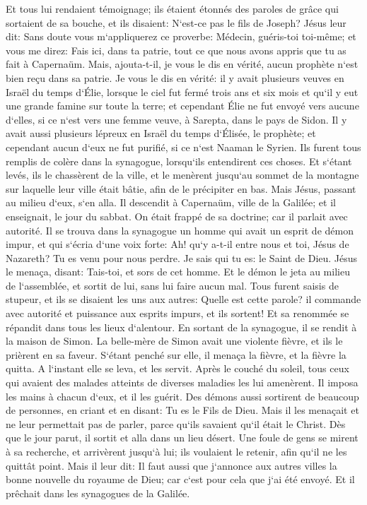 \verse Et tous lui rendaient témoignage; ils étaient étonnés des paroles de grâce qui sortaient de sa bouche, et ils disaient: N`est-ce pas le fils de Joseph? 
\verse Jésus leur dit: Sans doute vous m`appliquerez ce proverbe: Médecin, guéris-toi toi-même; et vous me direz: Fais ici, dans ta patrie, tout ce que nous avons appris que tu as fait à Capernaüm. 
\verse Mais, ajouta-t-il, je vous le dis en vérité, aucun prophète n`est bien reçu dans sa patrie. 
\verse Je vous le dis en vérité: il y avait plusieurs veuves en Israël du temps d`Élie, lorsque le ciel fut fermé trois ans et six mois et qu`il y eut une grande famine sur toute la terre; 
\verse et cependant Élie ne fut envoyé vers aucune d`elles, si ce n`est vers une femme veuve, à Sarepta, dans le pays de Sidon. 
\verse Il y avait aussi plusieurs lépreux en Israël du temps d`Élisée, le prophète; et cependant aucun d`eux ne fut purifié, si ce n`est Naaman le Syrien. 
\verse Ils furent tous remplis de colère dans la synagogue, lorsqu`ils entendirent ces choses. 
\verse Et s`étant levés, ils le chassèrent de la ville, et le menèrent jusqu`au sommet de la montagne sur laquelle leur ville était bâtie, afin de le précipiter en bas. 
\verse Mais Jésus, passant au milieu d`eux, s`en alla. 
\verse Il descendit à Capernaüm, ville de la Galilée; et il enseignait, le jour du sabbat. 
\verse On était frappé de sa doctrine; car il parlait avec autorité. 
\verse Il se trouva dans la synagogue un homme qui avait un esprit de démon impur, et qui s`écria d`une voix forte: 
\verse Ah! qu`y a-t-il entre nous et toi, Jésus de Nazareth? Tu es venu pour nous perdre. Je sais qui tu es: le Saint de Dieu. 
\verse Jésus le menaça, disant: Tais-toi, et sors de cet homme. Et le démon le jeta au milieu de l`assemblée, et sortit de lui, sans lui faire aucun mal. 
\verse Tous furent saisis de stupeur, et ils se disaient les uns aux autres: Quelle est cette parole? il commande avec autorité et puissance aux esprits impurs, et ils sortent! 
\verse Et sa renommée se répandit dans tous les lieux d`alentour. 
\verse En sortant de la synagogue, il se rendit à la maison de Simon. La belle-mère de Simon avait une violente fièvre, et ils le prièrent en sa faveur. 
\verse S`étant penché sur elle, il menaça la fièvre, et la fièvre la quitta. A l`instant elle se leva, et les servit. 
\verse Après le couché du soleil, tous ceux qui avaient des malades atteints de diverses maladies les lui amenèrent. Il imposa les mains à chacun d`eux, et il les guérit. 
\verse Des démons aussi sortirent de beaucoup de personnes, en criant et en disant: Tu es le Fils de Dieu. Mais il les menaçait et ne leur permettait pas de parler, parce qu`ils savaient qu`il était le Christ. 
\verse Dès que le jour parut, il sortit et alla dans un lieu désert. Une foule de gens se mirent à sa recherche, et arrivèrent jusqu`à lui; ils voulaient le retenir, afin qu`il ne les quittât point. 
\verse Mais il leur dit: Il faut aussi que j`annonce aux autres villes la bonne nouvelle du royaume de Dieu; car c`est pour cela que j`ai été envoyé. 
\verse Et il prêchait dans les synagogues de la Galilée. 

